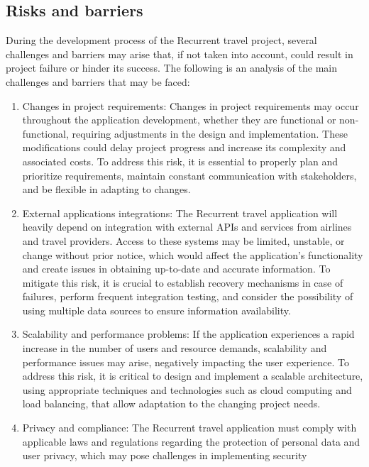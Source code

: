 \documentclass[../memory.tex]{subfiles}
\begin{document}
\subsection{Risks and barriers}
During the development process of the Recurrent travel project, several
challenges and barriers may arise that, if not taken into account, could result
in project failure or hinder its success. The following is an analysis of the
main challenges and barriers that may be faced:
\begin{enumerate}
	\item Changes in project requirements: Changes in project requirements may
	      occur throughout the application development, whether they are functional
	      or non-functional, requiring adjustments in the design and implementation.
	      These modifications could delay project progress and increase its
	      complexity and associated costs. To address this risk, it is essential to
	      properly plan and prioritize requirements, maintain constant communication
	      with stakeholders, and be flexible in adapting to changes.
	\item External applications integrations: The Recurrent travel application
	      will heavily depend on integration with external APIs and services from
	      airlines and travel providers. Access to these systems may be limited,
	      unstable, or change without prior notice, which would affect the
	      application's functionality and create issues in obtaining up-to-date and
	      accurate information. To mitigate this risk, it is crucial to establish
	      recovery mechanisms in case of failures, perform frequent integration
	      testing, and consider the possibility of using multiple data sources to
	      ensure information availability.
	\item Scalability and performance problems: If the application experiences a
	      rapid increase in the number of users and resource demands, scalability
	      and performance issues may arise, negatively impacting the user
	      experience. To address this risk, it is critical to design and implement a
	      scalable architecture, using appropriate techniques and technologies such
	      as cloud computing and load balancing, that allow adaptation to the
	      changing project needs.
	\item Privacy and compliance: The Recurrent travel application must comply
	      with applicable laws and regulations regarding the protection of personal
	      data and user privacy, which may pose challenges in implementing security

\end{enumerate}
\end{document}
